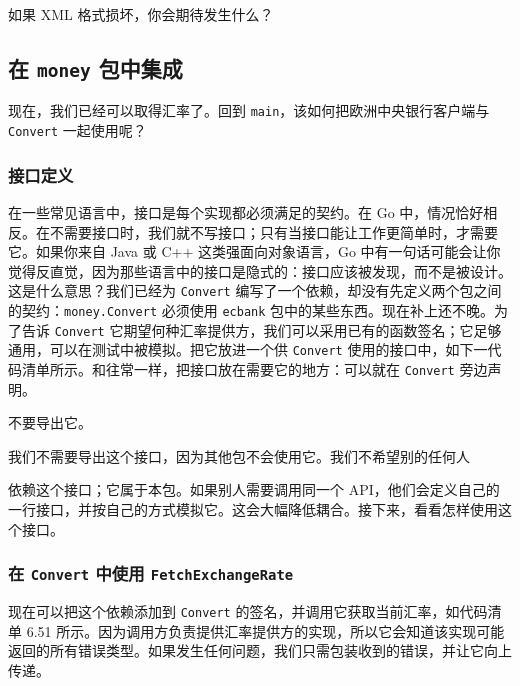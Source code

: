 如果 XML 格式损坏，你会期待发生什么？

\subsection{在 \texttt{money} 包中集成}

现在，我们已经可以取得汇率了。回到 \texttt{main}，该如何把欧洲中央银行客户端与 \texttt{Convert} 一起使用呢？

\subsubsection*{接口定义}

在一些常见语言中，接口是每个实现都必须满足的契约。在 Go 中，情况恰好相反。在不需要接口时，我们就不写接口；只有当接口能让工作更简单时，才需要它。如果你来自 Java 或 C++ 这类强面向对象语言，Go 中有一句话可能会让你觉得反直觉，因为那些语言中的接口是隐式的：接口应该被发现，而不是被设计。这是什么意思？我们已经为 \texttt{Convert} 编写了一个依赖，却没有先定义两个包之间的契约：\texttt{money.Convert} 必须使用 \texttt{ecbank} 包中的某些东西。现在补上还不晚。为了告诉 \texttt{Convert} 它期望何种汇率提供方，我们可以采用已有的函数签名；它足够通用，可以在测试中被模拟。把它放进一个供 \texttt{Convert} 使用的接口中，如下一代码清单所示。和往常一样，把接口放在需要它的地方：可以就在 \texttt{Convert} 旁边声明。


\begin{codeannotations}
\item 不要导出它。
\end{codeannotations}

我们不需要导出这个接口，因为其他包不会使用它。我们不希望别的任何人

依赖这个接口；它属于本包。如果别人需要调用同一个 API，他们会定义自己的一行接口，并按自己的方式模拟它。这会大幅降低耦合。接下来，看看怎样使用这个接口。

\subsubsection*{在 \texttt{Convert} 中使用 \texttt{FetchExchangeRate}}

现在可以把这个依赖添加到 \texttt{Convert} 的签名，并调用它获取当前汇率，如代码清单 6.51 所示。因为调用方负责提供汇率提供方的实现，所以它会知道该实现可能返回的所有错误类型。如果发生任何问题，我们只需包装收到的错误，并让它向上传递。

